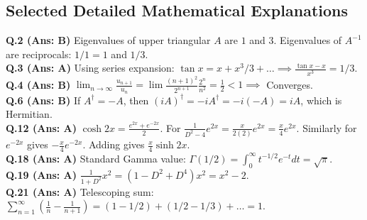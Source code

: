 \vspace{3mm}
\subsection*{Selected Detailed Mathematical Explanations}

\begin{solutionbox}
\textbf{Q.2 (Ans: B)} Eigenvalues of upper triangular $A$ are $1$ and $3$. Eigenvalues of $A^{-1}$ are reciprocals: $1/1 = 1$ and $1/3$.\\[2mm]
\textbf{Q.3 (Ans: A)} Using series expansion: $\tan x = x + x^3/3 + \dots \implies \frac{\tan x - x}{x^3} = 1/3$.\\[2mm]
\textbf{Q.4 (Ans: B)} $\lim_{n\to\infty} \frac{u_{n+1}}{u_n} = \lim \frac{(n+1)^2}{2^{n+1}} \frac{2^n}{n^2} = \frac{1}{2} < 1 \implies$ Converges.\\[2mm]
\textbf{Q.6 (Ans: B)} If $A^\dagger = -A$, then $(iA)^\dagger = -i A^\dagger = -i(-A) = iA$, which is Hermitian.\\[2mm]
\textbf{Q.12 (Ans: A)} $\cosh 2x = \frac{e^{2x} + e^{-2x}}{2}$. For $\frac{1}{D^2-4}e^{2x} = \frac{x}{2(2)}e^{2x} = \frac{x}{4}e^{2x}$. Similarly for $e^{-2x}$ gives $-\frac{x}{4}e^{-2x}$. Adding gives $\frac{x}{4}\sinh 2x$.\\[2mm]
\textbf{Q.18 (Ans: A)} Standard Gamma value: $\Gamma(1/2) = \int_0^\infty t^{-1/2}e^{-t}dt = \sqrt{\pi}$.\\[2mm]
\textbf{Q.19 (Ans: A)} $\frac{1}{1+D^2}x^2 = (1 - D^2 + D^4)x^2 = x^2 - 2$.\\[2mm]
\textbf{Q.21 (Ans: A)} Telescoping sum: $\sum_{n=1}^\infty \left(\frac{1}{n} - \frac{1}{n+1}\right) = (1 - 1/2) + (1/2 - 1/3) + \dots = 1$.
\end{solutionbox}

\newpage
